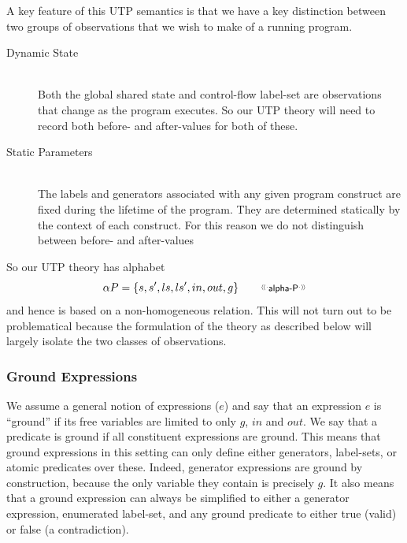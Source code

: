 A key feature of this UTP semantics is that we have a key distinction
between two groups of observations that we wish to make of a running program.
\begin{description}
  \item[Dynamic State]~\\
    Both the global shared state and control-flow label-set
    are observations that change as the program executes.
    So our UTP theory will need to record both before- and after-values
    for both of these.
  \item[Static Parameters]~\\
    The labels and generators associated with any given program
    construct are fixed during the lifetime of the program.
    They are determined statically by the context of each construct.
    For this reason we do not distinguish between before- and after-values
\end{description}
So our UTP theory has alphabet
\[
  \alpha P  = \setof{s,s',ls,ls',in,out,g}
  \qquad
  \elabel{alpha-P}
\]
and hence is based on a non-homogeneous relation.
This will not turn out to be problematical because
the formulation of the theory as described below will largely isolate the
two classes of observations.



\subsubsection{Ground Expressions}

We assume a general notion of expressions ($e$)
and say that an expression $e$ is ``ground''
if its free variables are limited to only $g$, $in$ and $out$.
We say that a predicate is ground if all constituent expressions
are ground.
This means that ground expressions in this setting can only
define either generators, label-sets, or atomic predicates
over these.
Indeed, generator expressions are ground by construction,
because the only variable they contain is precisely $g$.
It also means that a ground expression can always be simplified
to either a generator expression, enumerated label-set,
and any ground predicate to either true (valid) or false (a contradiction).



